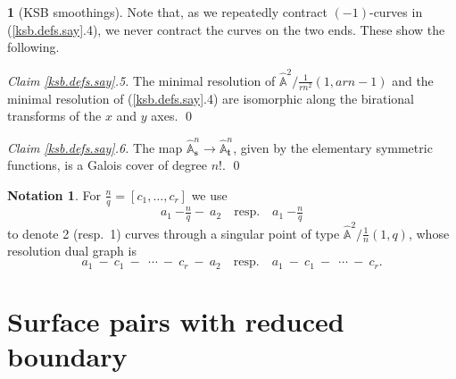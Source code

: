 \documentclass{amsart}
\theoremstyle{definition}
\newtheorem{say}[thm]{}
\newtheorem{notation}[thm]{Notation}
\theoremstyle{remark}
\renewcommand{\a}[0]{\hat{\mathbb A}}
\newcommand{\qtq}[1]{\quad\mbox{#1}\quad}
\begin{document}
\begin{say}[KSB smoothings]
   Note that, as we repeatedly contract $(-1)$-curves in  (\ref{ksb.defs.say}.4), we never contract the curves on the two ends. These show the following.
   \medskip

   {\it Claim \ref{ksb.defs.say}.5.}  The minimal resolution of
   $\a^2/\tfrac1{rn^2}(1, arn{-}1)$ and the minimal resolution of (\ref{ksb.defs.say}.4) are isomorphic along the birational transforms of the $x$ and $y$ axes. \qed
   \medskip




   {\it Claim \ref{ksb.defs.say}.6.}
 The map  $\a^n_{\mathbf s}\to \a^n_{\mathbf t}$, given by the elementary symmetric functions, is a Galois cover of degree $n!$. \qed
  \end{say}



  \begin{notation} \label{boxed.nota} For $\frac{n}{q}=[c_1,\dots, c_r]$ we use
    $$
    a_1\ {-\boxed{\tfrac{n}{q}}-}\ a_2   \qtq{resp.}
    a_1\ {-\boxed{\tfrac{n}{q}}}
    $$
    to denote 2 (resp.\ 1) curves through a singular point of type $\a^2/\frac1{n}(1,q)$,  whose resolution dual graph is
    $$
    a_1\ -\ c_1 \ -\  \ \cdots \ - \ c_r \ -\ a_2
    \qtq{resp.}
     a_1\ -\ c_1 \ -\  \ \cdots \ - \ c_r.
    $$
    \end{notation}
    

    
\section{Surface pairs with reduced boundary}
\end{document}
